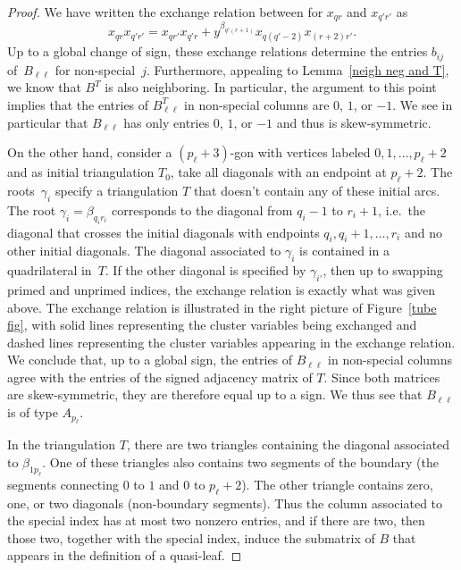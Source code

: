 \documentclass[10pt]{article}
\theoremstyle{definition}
\theoremstyle{remark}
\numberwithin{equation}{section}
\newcommand{\0}{{\mathbf{0}}}
\begin{document}
\begin{proof}
We have written the exchange relation between for $x_{qr}$ and $x_{q'r'}$ as 
\begin{equation}\label{exch rel eq}
x_{qr}x_{q'r'}=x_{qr'}x_{q'r}+y^{\beta_{q'(r+1)}}x_{q(q'-2)}x_{(r+2)r'}.
\end{equation}
Up to a global change of sign, these exchange relations determine the entries $b_{ij}$ of~$B_{\ell\ell}$ for non-special~$j$.
Furthermore, appealing to Lemma~\ref{neigh neg and T}, we know that $B^T$ is also neighboring.
In particular, the argument to this point implies that the entries of $B_{\ell\ell}^T$ in non-special columns are $0$, $1$, or $-1$.
We see in particular that $B_{\ell\ell}$ has only entries $0$, $1$, or $-1$ and thus is skew-symmetric. 

On the other hand, consider a $(p_\ell+3)$-gon with vertices labeled $0,1,\ldots,p_\ell+2$ and as initial triangulation $T_0$, take all diagonals with an endpoint at $p_\ell+2$.
The roots~$\gamma_i$ specify a triangulation $T$ that doesn't contain any of these initial arcs.
The root $\gamma_i=\beta_{q_i r_i}$ corresponds to the diagonal from $q_i-1$ to $r_i+1$, i.e.\ the diagonal that crosses the initial diagonals with endpoints $q_i,q_i+1,\ldots,r_i$ and no other initial diagonals.  
The diagonal associated to $\gamma_i$ is contained in a quadrilateral in~$T$.
If the other diagonal is specified by $\gamma_{i'}$, then up to swapping primed and unprimed indices, the exchange relation is exactly what was given above.
The exchange relation is illustrated in the right picture of Figure~\ref{tube fig}, with solid lines representing the cluster variables being exchanged and dashed lines representing the cluster variables appearing in the exchange relation.
We conclude that, up to a global sign, the entries of  $B_{\ell\ell}$ in non-special columns agree with the entries of the signed adjacency matrix of $T$.
Since both matrices are skew-symmetric, they are therefore equal up to a sign.
We thus see that $B_{\ell\ell}$ is of type $A_{p_\ell}$.

In the triangulation $T$, there are two triangles containing the diagonal associated to $\beta_{1 p_\ell}$.
One of these triangles also contains two segments of the boundary (the segments connecting $0$ to $1$ and $0$ to $p_\ell+2$).
The other triangle contains zero, one, or two diagonals (non-boundary segments).
Thus the column associated to the special index has at most two nonzero entries, and if there are two, then those two, together with the special index, induce the submatrix of $B$ that appears in the definition of a quasi-leaf.
\end{proof}
\end{document}
